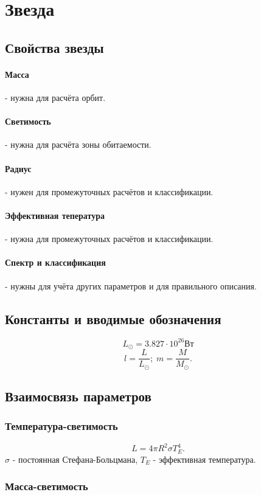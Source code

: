 \section{Звезда}
\subsection{Свойства звезды}
\paragraph{Масса} - нужна для расчёта орбит.
\paragraph{Светимость} - нужна для расчёта зоны обитаемости.
\paragraph{Радиус} - нужен для промежуточных расчётов и классификации.
\paragraph{Эффективная тепература} - нужна для промежуточных расчётов и классификации.
\paragraph{Спектр и классификация} - нужны для учёта других параметров и для правильного описания.

\subsection{Константы и вводимые обозначения}
$$L_\odot = 3.827\cdot 10^{26} \mbox{Вт}$$
$$l=\frac{L}{L_\odot};\; m=\frac{M}{M_\odot}.$$
\subsection{Взаимосвязь параметров}


\subsubsection{Температура-светимость}
\begin{equation}
L=4\pi R^2\sigma T_E^4.
\end{equation}
$\sigma$ - постоянная Стефана-Больцмана,
$T_E$ - эффективная температура.

\subsubsection{Масса-светимость}

